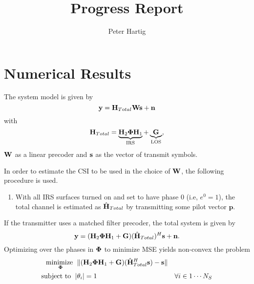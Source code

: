 \documentclass[12pt,a4paper]{report}
\title{Progress Report}
\author{Peter Hartig}
\begin{document}
\maketitle
\tableofcontents

\section{Numerical Results}
The system model is given by 
\begin{equation}
\mathbf{y} = \mathbf{H}_{Total} \mathbf{W} \mathbf{s}  + \mathbf{n}
\end{equation}
with 
	\begin{equation*}
	\mathbf{H}_{Total} = \underbrace{\mathbf{H}_{2}\boldsymbol{\Phi}\mathbf{H}_{1}}_{\text{IRS}} + \underbrace{\mathbf{G}}_{\text{LOS}},
	\end{equation*}
	$\mathbf{W}$ as a linear precoder and $\mathbf{s}$ as the vector of transmit symbols.
	\par
	In order to estimate the CSI to be used in the choice of $\mathbf{W}$, the following procedure is used. 
	\begin{enumerate}
	\item
		With all IRS surfaces turned on and set to have phase 0 (i.e, $e^0 =1$),  the total channel is estimated as $\hat{\mathbf{H}}_{Total}$ by 
		transmitting some pilot vector $\mathbf{p}$. 
	\end{enumerate}
If the transmitter uses a matched filter precoder, the total system is given by 
\begin{equation}
	\mathbf{y} = (\mathbf{H}_{2}\boldsymbol{\Phi}\mathbf{H}_{1} + \mathbf{G}) (\hat{\mathbf{H}}_{Total})^H \mathbf{s}  + \mathbf{n}.
\end{equation}
Optimizing over the phases in $\boldsymbol{\Phi}$ to minimize MSE yields non-convex the problem
			\begin{subequations}
	\label{optim}
	\begin{align}
	    \underset{\boldsymbol{\Phi}}{\text{minimize }}
	    & \; \| (\mathbf{H}_{2}\boldsymbol{\Phi}\mathbf{H}_{1} + \mathbf{G})(\hat{\mathbf{H}}_{Total}^H\mathbf{s}) - \mathbf{s} \| \\
	    \text{subject to  } \; &
	    | \theta_i | = 1 & \forall i \in {1 \cdots	 N_S}
	\end{align}
	\end{subequations}	
\end{document}
